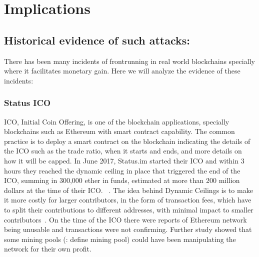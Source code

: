 


\section{Implications} %

\subsection{Historical evidence of such attacks:}\par\noindent
There has been many incidents of frontrunning in real world blockchains specially where it facilitates monetary gain. Here we will analyze the evidence of these incidents:


\subsubsection{Status ICO}
ICO, Initial Coin Offering, is one of the blockchain applications, specially blockchains such as Ethereum with smart contract capability. The common practice is to deploy a smart contract on the blockchain indicating the details of the ICO such as the trade ratio, when it starts and ends, and more details on how it will be capped.
In June 2017, Status.im started their ICO and within 3 hours they reached the dynamic ceiling in place that triggered the end of the ICO, summing in 300,000 ether in funds, estimated at more than 200 million dollars at the time of their ICO. ~\cite{statusicoanalysis}. The idea behind Dynamic Ceilings is to make it more costly for larger contributors,  in the form of transaction fees, which have to split their contributions to different addresses, with minimal impact to smaller contributors~\cite{statuswhitepaper}.
On the time of the ICO there were reports of Ethereum network being unusable and transactions were not confirming. Further study showed that some mining pools (\todo: define mining pool) could have been manipulating the network for their own profit.
 


